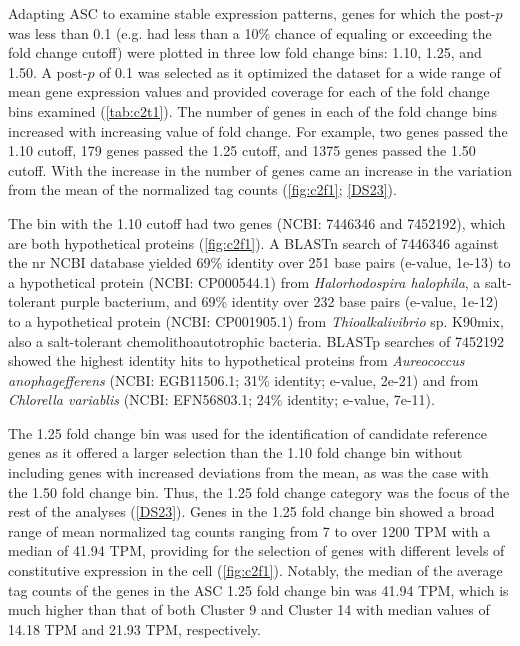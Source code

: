 Adapting ASC to examine stable expression patterns, genes for which the post-$p$ was less than 0.1 (e.g. had less than a 10\% chance of equaling or exceeding the fold change cutoff) were plotted in three low fold change bins: 1.10, 1.25, and 1.50. A post-$p$ of 0.1 was selected as it optimized the dataset for a wide range of mean gene expression values and provided coverage for each of the fold change bins examined (\cref{tab:c2t1}). The number of genes in each of the fold change bins increased with increasing value of fold change. For example, two genes passed the 1.10 cutoff, 179 genes passed the 1.25 cutoff, and 1375 genes passed the 1.50 cutoff. With the increase in the number of genes came an increase in the variation from the mean of the normalized tag counts (\cref{fig:c2f1}; \ref{DS23}). \par
The bin with the 1.10 cutoff had two genes (NCBI: 7446346 and 7452192), which are both hypothetical proteins (\cref{fig:c2f1}). A BLASTn search of 7446346 against the nr NCBI database yielded 69\% identity over 251 base pairs (e-value, 1e-13) to a hypothetical protein (NCBI: CP000544.1) from \textit{Halorhodospira halophila}, a salt-tolerant purple bacterium, and 69\% identity over 232 base pairs (e-value, 1e-12) to a hypothetical protein (NCBI: CP001905.1) from \textit{Thioalkalivibrio} sp. K90mix, also a salt-tolerant chemolithoautotrophic bacteria. BLASTp searches of 7452192 showed the highest identity hits to hypothetical proteins from \textit{Aureococcus anophagefferens} (NCBI: EGB11506.1; 31\% identity; e-value, 2e-21) and from \textit{Chlorella variablis} (NCBI: EFN56803.1; 24\% identity; e-value, 7e-11).\par




The 1.25 fold change bin was used for the identification of candidate reference genes as it offered a larger selection than the 1.10 fold change bin without including genes with increased deviations from the mean, as was the case with the 1.50 fold change bin. Thus, the 1.25 fold change category was the focus of the rest of the analyses (\ref{DS23}). Genes in the 1.25 fold change bin showed a broad range of mean normalized tag counts ranging from 7 to over 1200 TPM with a median of 41.94 TPM, providing for the selection of genes with different levels of constitutive expression in the cell (\cref{fig:c2f1}). Notably, the median of the average tag counts of the genes in the ASC 1.25 fold change bin was 41.94 TPM, which is much higher than that of both Cluster 9 and Cluster 14 with median values of 14.18 TPM and 21.93 TPM, respectively. \par

